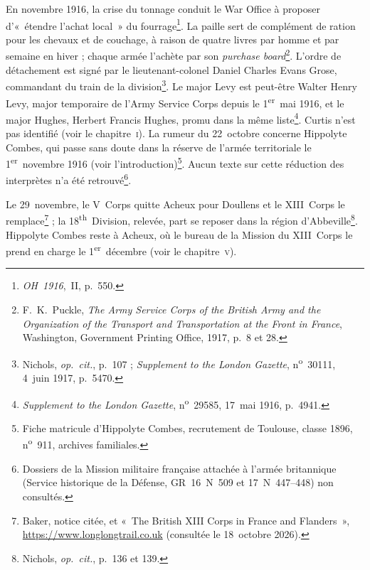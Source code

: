 En novembre 1916, la crise du tonnage conduit le War Office à proposer d'«~étendre l'achat local~» du fourrage\footnote{\textit{OH~1916},~II, p.~550.}. La paille sert de complément de ration pour les chevaux et de couchage, à raison de quatre livres par homme et par semaine en hiver ; chaque armée l'achète par son \textit{purchase board}\footnote{F.~K.~Puckle, \textit{The Army Service Corps of the British Army and the Organization of the Transport and Transportation at the Front in France}, Washington, Government Printing Office, 1917, p.~8 et 28.}. L'ordre de détachement est signé par le lieutenant-colonel Daniel Charles Evans Grose, commandant du train de la division\footnote{Nichols, \textit{op.~cit.}, p.~107 ; \textit{Supplement to the London Gazette}, n\textsuperscript{o}~30111, 4~juin 1917, p.~5470.}. Le major Levy est peut-être Walter Henry Levy, major temporaire de l'Army Service Corps depuis le 1\textsuperscript{er}~mai 1916, et le major Hughes, Herbert Francis Hughes, promu dans la même liste\footnote{\textit{Supplement to the London Gazette}, n\textsuperscript{o}~29585, 17~mai 1916, p.~4941.}. Curtis n'est pas identifié (voir le chapitre~\textsc{i}). La rumeur du 22~octobre concerne Hippolyte Combes, qui passe sans doute dans la réserve de l'armée territoriale le 1\textsuperscript{er}~novembre 1916 (voir l'introduction)\footnote{Fiche matricule d'Hippolyte Combes, recrutement de Toulouse, classe 1896, n\textsuperscript{o}~911, archives familiales.}. Aucun texte sur cette réduction des interprètes n'a été retrouvé\footnote{Dossiers de la Mission militaire française attachée à l'armée britannique (Service historique de la Défense, GR~16~N~509 et 17~N~447--448) non consultés.}.

Le 29~novembre, le V~Corps quitte Acheux pour Doullens et le XIII~Corps le remplace\footnote{Baker, notice citée, et «~The British XIII Corps in France and Flanders~», \url{https://www.longlongtrail.co.uk} (consultée le 18~octobre 2026).} ; la 18\textsuperscript{th}~Division, relevée, part se reposer dans la région d'Abbeville\footnote{Nichols, \textit{op.~cit.}, p.~136 et 139.}. Hippolyte Combes reste à Acheux, où le bureau de la Mission du XIII~Corps le prend en charge le 1\textsuperscript{er}~décembre (voir le chapitre~\textsc{v}).
